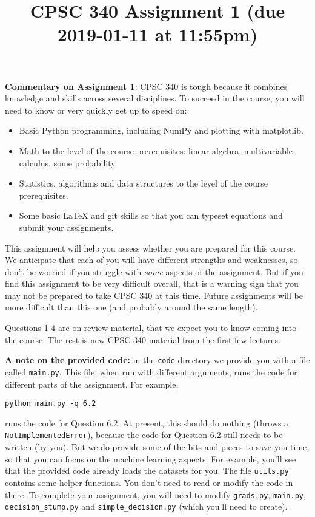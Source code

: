 \documentclass{article}
\begin{document}
\title{CPSC 340 Assignment 1 (due 2019-01-11 at 11:55pm)}


\date{}
\maketitle


\vspace{-4em}

\textbf{Commentary on Assignment 1}: CPSC 340 is tough because it combines knowledge and skills across several disciplines. To succeed
in the course, you will need to know or very quickly get up to speed on:
\begin{itemize}
\item Basic Python programming, including NumPy and plotting with matplotlib.
\item Math to the level of the course prerequisites: linear algebra, multivariable calculus, some probability.
\item Statistics, algorithms and data structures to the level of the course prerequisites.
\item Some basic LaTeX and git skills so that you can typeset equations and submit your assignments.
\end{itemize}
  
This assignment will help you assess whether you are prepared for this course. We anticipate that each
of you will have different strengths and weaknesses, so don't be worried if you struggle with \emph{some} aspects
of the assignment. But if you find this assignment
to be very difficult overall, that is a warning sign that you may not be prepared to take CPSC 340
at this time. Future assignments will be more difficult than this one (and probably around the same length).

Questions 1-4 are on review material, that we expect you to know coming into the course. The rest is new CPSC 340 material from the first few lectures.

\textbf{A note on the provided code:} in the \texttt{code} directory we provide you with a file called
\texttt{main.py}. This file, when run with different arguments, runs the code for different
parts of the assignment. For example,
\begin{verbatim}
python main.py -q 6.2
\end{verbatim}
runs the code for Question 6.2. At present, this should do nothing (throws a \texttt{NotImplementedError}), because the code
for Question 6.2 still needs to be written (by you). But we do provide some of the bits
and pieces to save you time, so that you can focus on the machine learning aspects.
For example, you'll see that the provided code already loads the datasets for you.
The file \texttt{utils.py} contains some helper functions.
You don't need to read or modify the code in there.
To complete your assignment, you will need to modify \texttt{grads.py}, \texttt{main.py}, \texttt{decision\string_stump.py} and \texttt{simple\string_decision.py} (which you'll need to create).
\end{document}
